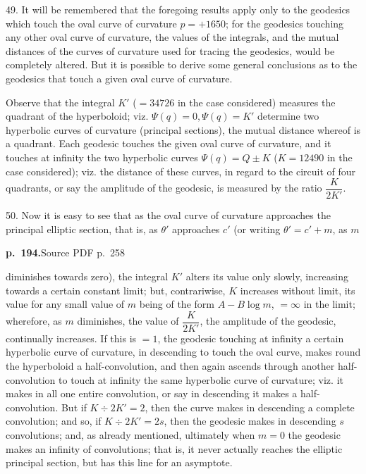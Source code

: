 \documentclass[11pt,a4paper]{article}
\newcommand{\sourcepage}[2]{\par\bigskip\noindent\textbf{p.~#1.}\hfill{\footnotesize Source PDF p.~#2}\par\nobreak\medskip}
\begin{document}
49. It will be remembered that the foregoing results apply only to the geodesics which touch the oval curve of curvature $p=+1650$; for the geodesics touching any other oval curve of curvature, the values of the integrals, and the mutual distances of the curves of curvature used for tracing the geodesics, would be completely altered. But it is possible to derive some general conclusions as to the geodesics that touch a given oval curve of curvature.

Observe that the integral $K'$ ($=34726$ in the case considered) measures the quadrant of the hyperboloid; viz. $\Psi(q)=0,\Psi(q)=K'$ determine two hyperbolic curves of curvature (principal sections), the mutual distance whereof is a quadrant. Each geodesic touches the given oval curve of curvature, and it touches at infinity the two hyperbolic curves $\Psi(q)=Q\pm K$ ($K=12490$ in the case considered); viz. the distance of these curves, in regard to the circuit of four quadrants, or say the amplitude of the geodesic, is measured by the ratio $\dfrac{K}{2K'}$.

50. Now it is easy to see that as the oval curve of curvature approaches the principal elliptic section, that is, as $\theta'$ approaches $c'$ (or writing $\theta'=c'+m$, as $m$

\sourcepage{194}{258}
diminishes towards zero), the integral $K'$ alters its value only slowly, increasing towards a certain constant limit; but, contrariwise, $K$ increases without limit, its value for any small value of $m$ being of the form $A-B\log m$, $=\infty$ in the limit; wherefore, as $m$ diminishes, the value of $\dfrac{K}{2K'}$, the amplitude of the geodesic, continually increases. If this is $=1$, the geodesic touching at infinity a certain hyperbolic curve of curvature, in descending to touch the oval curve, makes round the hyperboloid a half-convolution, and then again ascends through another half-convolution to touch at infinity the same hyperbolic curve of curvature; viz. it makes in all one entire convolution, or say in descending it makes a half-convolution. But if $K\div2K'=2$, then the curve makes in descending a complete convolution; and so, if $K\div2K'=2s$, then the geodesic makes in descending $s$ convolutions; and, as already mentioned, ultimately when $m=0$ the geodesic makes an infinity of convolutions; that is, it never actually reaches the elliptic principal section, but has this line for an asymptote.
\end{document}
